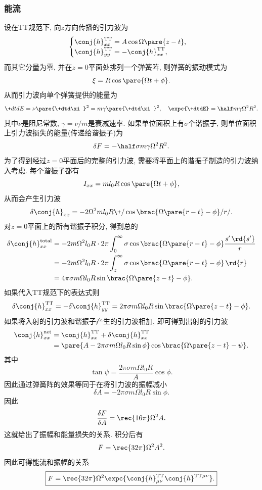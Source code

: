 \documentclass[hidelinks]{ctexart}
\begin{document}
\subsubsection{能流} %
\label{ssub:能流}

设在TT规范下, 向$z$方向传播的引力波为
\[ \begin{cases}
    \conj{h}^{\mathrm{TT}}_{xx} = A\cos\Omega\pare{z-t}, \\
    \conj{h}^{\mathrm{TT}}_{yy} = -\conj{h}^{\mathrm{TT}}_{xx},
\end{cases} \]
而其它分量为零, 并在$z=0$平面处排列一个弹簧阵, 则弹簧的振动模式为
\[ \xi = R\cos\pare{\Omega t + \phi}. \]
从而引力波向单个弹簧提供的能量为
\[ \+dtdE = \nu\pare{\+dtd\xi}^2 = m\gamma\pare{\+dtd\xi}^2,\quad \expc{\+dtdE} = \half m\gamma \Omega^2 R^2. \]
其中$\nu$是阻尼常数, $\gamma = \nu/m$是衰减速率. 如果单位面积上有$\sigma$个谐振子, 则单位面积上引力波损失的能量(传递给谐振子)为
\[ \delta F = -\half \sigma m\gamma \Omega^2 R^2. \]
为了得到经过$z=0$平面后的完整的引力波, 需要将平面上的谐振子制造的引力波纳入考虑. 每个谐振子都有
\[ I_{xx} = m l_0 R\cos\pare{\Omega t + \phi}, \]
从而会产生引力波
\[ \delta \conj{h}_{xx} = -2\Omega^2 ml_0 R \+/\cos\brac{\Omega \pare{r-t} - \phi}/r/. \]
对$z=0$平面上的所有谐振子积分, 得到总的
\begin{align*}
    \delta \conj{h}^{\mathrm{total}}_{xx} &= -2m\Omega^2 l_0 R\cdot 2\pi \int_0^\infty \sigma \cos\brac{\Omega\pare{r-t} - \phi} \frac{s'\,\rd{s'}}{r} \\ &= -2m\Omega^2 l_0 R\cdot 2\pi \int_{z}^\infty \sigma \cos\brac{\Omega\pare{r-t}-\phi}\,\rd{r} \\ &= 4\pi \sigma m \Omega l_0 R \sin \brac{\Omega\pare{z-t} - \phi}.
\end{align*}
如果代入TT规范下的表达式则
\[ \delta \conj{h}_{xx}^{\mathrm{TT}} = -\delta \conj{h}_{yy}^{\mathrm{TT}} = 2\pi \sigma m\Omega l_0 R \sin\brac{\Omega \pare{z-t} - \phi}. \]
如果将入射的引力波和谐振子产生的引力波相加, 即可得到出射的引力波
\begin{align*}
    \conj{h}^{\mathrm{net}}_{xx} &= \conj{h}^{\mathrm{TT}}_{xx} + \delta \conj{h}^{\mathrm{TT}}_{xx} \\
    &= \pare{A - 2\pi \sigma m\Omega l_0 R\sin\phi} \cos\brac{\Omega\pare{z-t} - \psi}.
\end{align*}
其中
\[ \tan \psi = \frac{2\pi \sigma m\Omega l_0 R}{A}\cos\phi. \]
因此通过弹簧阵的效果等同于在将引力波的振幅减小
\[ \delta A = -2\pi \sigma m\Omega l_0 R \sin \phi. \]
因此
\[ \frac{\delta F}{\delta A} = \rec{16\pi} \Omega^2 A. \]
这就给出了振幅和能量损失的关系. 积分后有
\[ F = \rec{32\pi} \Omega^2 A^2. \]
因此可得能流和振幅的关系
\[ \boxed{F = \rec{32\pi}\Omega^2 \expc{\conj{h}_{\mu\nu}^{\mathrm{TT}} \conj{h}^{\mathrm{TT}\mu\nu}}.} \]
\end{document}
